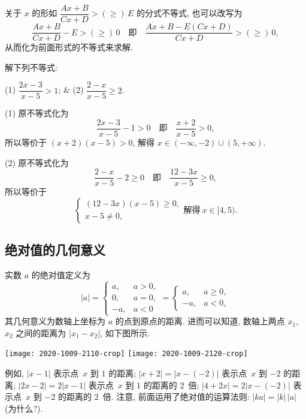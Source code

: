 关于 $x$ 的形如 $\dfrac{Ax+B}{Cx+D}>(\geqslant)\,E$ 的分式不等式, 也可以改写为
\[\frac{Ax+B}{Cx+D}-E>(\geqslant)\,0\quad \text{即}\quad
  \frac{Ax+B-E(Cx+D)}{Cx+D}>(\geqslant)\,0,\]
从而化为前面形式的不等式来求解.

\begin{example}
  解下列不等式:
  \begin{twocolpro}
    (1) $\dfrac{2x-3}{x-5}>1$; & (2) $\dfrac{2-x}{x-5}\geqslant 2$.
  \end{twocolpro}
\end{example}
\begin{solution}
  (1) 原不等式化为
  \[\frac{2x-3}{x-5}-1>0\quad \text{即}\quad \frac{x+2}{x-5}>0,\] 
  所以等价于 $(x+2)(x-5)>0$, 解得 $x\in (-\infty,-2)\cup (5,+\infty)$.
  
  (2) 原不等式化为
  \[\frac{2-x}{x-5}-2\geqslant 0\quad \text{即}\quad \frac{12-3x}{x-5}\geqslant 0,\] 
  所以等价于
  \[\left\{\!\!\begin{array}{l}
        (12-3x)(x-5)\geqslant 0,\\
        x-5\neq 0,
      \end{array}\right. \text{解得}\ 
      x\in [4,5).\]
\end{solution}

\subsection{绝对值的几何意义}

实数 $a$ 的绝对值定义为
\[|a|=\begin{cases}
  a, & a>0,\\
  0, & a=0,\\
  -a, & a<0
  \end{cases}= \begin{cases}
    a, & a\geqslant 0,\\
    -a, & a<0,
    \end{cases}\]
其几何意义为数轴上坐标为 $a$ 的点到原点的距离. 进而可以知道, 数轴上两点 $x_1$, $x_2$ 之间的距离为 $|x_1-x_2|$, 如下图所示.

\begin{center}
  \texttt{[image: 2020-1009-2110-crop]}\qquad
  \texttt{[image: 2020-1009-2120-crop]}
\end{center}

例如, $|x-1|$ 表示点~$x$ 到 $1$ 的距离; $|x+2|=|x-(-2)|$ 表示点~$x$ 到 $-2$ 的距离; $|2x-2|= 2|x-1|$ 表示点~$x$ 到 $1$ 的距离的 $2$~倍; $|4+2x|= 2|x-(-2)|$ 表示点~$x$ 到 $-2$ 的距离的 $2$~倍. 注意, 前面运用了绝对值的运算法则: $|ka|= |k|\,|a|$ (为什么?).

